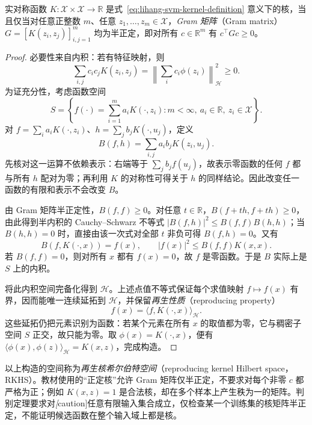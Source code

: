 \begin{theorem}
\label{thm:lihang-svm-gram}
实对称函数 $K:\mathcal X\times\mathcal X\to\mathbb R$ 是式~\eqref{eq:lihang-svm-kernel-definition} 意义下的核，当且仅当对任意正整数 $m$、任意 $z_1,\ldots,z_m\in\mathcal X$，\emph{Gram 矩阵}（Gram matrix）$G=[K(z_i,z_j)]_{i,j=1}^{m}$ 均为半正定，即对所有 $c\in\mathbb R^m$ 有 $c^\top Gc\ge0$。
\end{theorem}
\begin{proof}
必要性来自内积：若有特征映射，则
\[
  \sum_{i,j}c_i c_j K(z_i,z_j)
    =\left\lVert\sum_i c_i\phi(z_i)\right\rVert_{\mathcal H}^2\ge0.
\]
为证充分性，考虑函数空间
\[
  S=\left\{f(\cdot)=\sum_{i=1}^{m}a_iK(\cdot,z_i):
      m<\infty,\ a_i\in\mathbb R,\ z_i\in\mathcal X\right\}.
\]
对 $f=\sum_i a_iK(\cdot,z_i)$、$h=\sum_j b_jK(\cdot,u_j)$，定义
\begin{equation}
  B(f,h)=\sum_{i,j}a_i b_jK(z_i,u_j).
  \label{eq:lihang-svm-rkhs-inner}
\end{equation}
先核对这一运算不依赖表示：右端等于 $\sum_j b_j f(u_j)$，故表示零函数的任何 $f$ 都与所有 $h$ 配对为零；再利用 $K$ 的对称性可得关于 $h$ 的同样结论。因此改变任一函数的有限和表示不会改变 $B$。

由 Gram 矩阵半正定性，$B(f,f)\ge0$。对任意 $t\in\mathbb R$，$B(f+th,f+th)\ge0$，由此得到半内积的 Cauchy--Schwarz 不等式 $|B(f,h)|^2\le B(f,f)B(h,h)$；当 $B(h,h)=0$ 时，直接由该一次式对全部 $t$ 非负可得 $B(f,h)=0$。又有
\[
  B(f,K(\cdot,x))=f(x),
  \qquad |f(x)|^2\le B(f,f)K(x,x).
\]
若 $B(f,f)=0$，则对所有 $x$ 都有 $f(x)=0$，故 $f$ 是零函数。于是 $B$ 实际上是 $S$ 上的内积。

将此内积空间完备化得到 $\mathcal H$。上述点值不等式保证每个求值映射 $f\mapsto f(x)$ 有界，因而能唯一连续延拓到 $\mathcal H$，并保留\emph{再生性质}（reproducing property）
\begin{equation}
  f(x)=\langle f,K(\cdot,x)\rangle_{\mathcal H}.
  \label{eq:lihang-svm-reproducing}
\end{equation}
这些延拓仍把元素识别为函数：若某个元素在所有 $x$ 的取值都为零，它与稠密子空间 $S$ 正交，故只能为零。取 $\phi(x)=K(\cdot,x)$，便有 $\langle\phi(x),\phi(z)\rangle_{\mathcal H}=K(x,z)$，完成构造。
\end{proof}

以上构造的空间称为\emph{再生核希尔伯特空间}（reproducing kernel Hilbert space，RKHS）。教材使用的“正定核”允许 Gram 矩阵仅半正定，不要求对每个非零 $c$ 都严格为正；例如 $K(x,z)=1$ 是合法核，却在多个样本上产生秩为一的矩阵。判别定理要求对\emph[caution]{任意有限输入集合}成立，仅检查某一个训练集的核矩阵半正定，不能证明候选函数在整个输入域上都是核。

